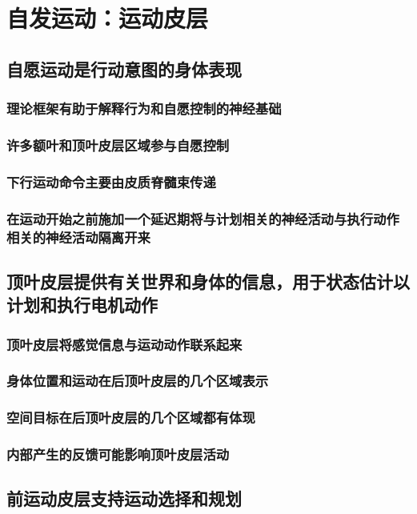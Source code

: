 \chapter{自发运动：运动皮层}

\section{自愿运动是行动意图的身体表现}
\subsection{理论框架有助于解释行为和自愿控制的神经基础}
\subsection{许多额叶和顶叶皮层区域参与自愿控制}
\subsection{下行运动命令主要由皮质脊髓束传递}
\subsection{在运动开始之前施加一个延迟期将与计划相关的神经活动与执行动作相关的神经活动隔离开来}

\section{顶叶皮层提供有关世界和身体的信息，用于状态估计以计划和执行电机动作}
\subsection{顶叶皮层将感觉信息与运动动作联系起来}
\subsection{身体位置和运动在后顶叶皮层的几个区域表示}
\subsection{空间目标在后顶叶皮层的几个区域都有体现}
\subsection{内部产生的反馈可能影响顶叶皮层活动}

\section{前运动皮层支持运动选择和规划}
